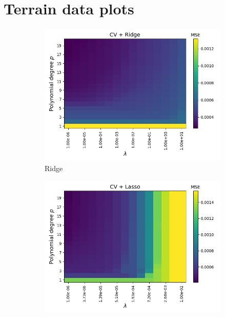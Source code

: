 \documentclass[a4paper]{article}
\begin{document}
\section{Terrain data plots} \label{app:terrainplots}
\begin{figure}[H]
  \centering
  \begin{subfigure}{0.49\textwidth}
    \includegraphics[scale=0.45]{../figures/task_g/Ridge/heatmap_cv_error_N22500_patch1_pmax20_nlamb15_Ridge_cv_k5.png}
    \caption{Ridge}
  \end{subfigure}
  \begin{subfigure}{0.49\textwidth}
    \includegraphics[scale=0.45]{../figures/task_g/Lasso/heatmap_cv_error_N22500_patch1_pmax20_nlamb15_Lasso_cv_k5.png}

\end{subfigure}
\end{figure}
\end{document}
